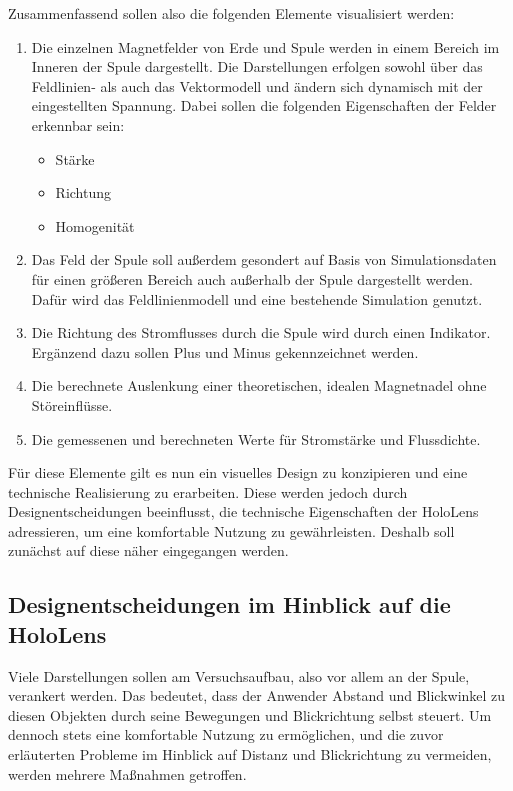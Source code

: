 Zusammenfassend sollen also die folgenden Elemente visualisiert werden:
\begin{enumerate}
	\item Die einzelnen Magnetfelder von Erde und Spule werden in einem Bereich im Inneren der Spule dargestellt. Die Darstellungen erfolgen sowohl über das Feldlinien- als auch das Vektormodell und ändern sich dynamisch mit der eingestellten Spannung. Dabei sollen die folgenden Eigenschaften der Felder erkennbar sein:
	\begin{itemize}[topsep=-0.25em]
		\setlength{\itemsep}{-0.25em}
		\item Stärke
		\item Richtung
		\item Homogenität
	\end{itemize}
	\item Das Feld der Spule soll außerdem gesondert auf Basis von Simulationsdaten für einen größeren Bereich auch außerhalb der Spule dargestellt werden. Dafür wird das Feldlinienmodell und eine bestehende Simulation genutzt.
	\item Die Richtung des Stromflusses durch die Spule wird durch einen Indikator. Ergänzend dazu sollen Plus und Minus gekennzeichnet werden.
	\item Die berechnete Auslenkung einer theoretischen, idealen Magnetnadel ohne Störeinflüsse. 
	\item Die gemessenen und berechneten Werte für Stromstärke und Flussdichte.
\end{enumerate}
\vspace{6px}

Für diese Elemente gilt es nun ein visuelles Design zu konzipieren und eine technische Realisierung zu erarbeiten. Diese werden jedoch durch Designentscheidungen beeinflusst, die technische Eigenschaften der HoloLens adressieren, um eine komfortable Nutzung zu gewährleisten. Deshalb soll zunächst auf diese näher eingegangen werden.

\subsection{Designentscheidungen im Hinblick auf die HoloLens}
\label{sec-4-2}
Viele Darstellungen sollen am Versuchsaufbau, also vor allem an der Spule, verankert werden. Das bedeutet, dass der Anwender Abstand und Blickwinkel zu diesen Objekten durch seine Bewegungen und Blickrichtung selbst steuert. Um dennoch stets eine komfortable Nutzung zu ermöglichen, und die zuvor erläuterten Probleme im Hinblick auf Distanz und Blickrichtung zu vermeiden, werden mehrere Maßnahmen getroffen.\\

